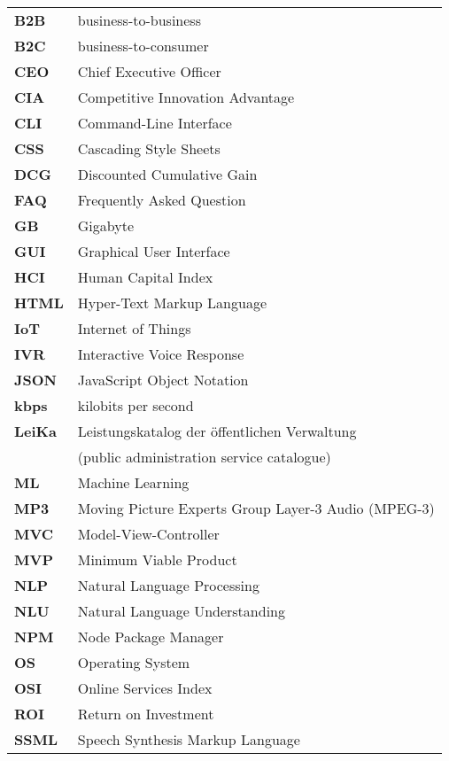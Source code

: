 \begin{flushleft}
\begin{tabular}{ll}
\textbf{B2B}	&	business-to-business\\
\textbf{B2C}	&	business-to-consumer\\

\textbf{CEO}	&	Chief Executive Officer\\
\textbf{CIA}	&	Competitive Innovation Advantage\\
\textbf{CLI}	&	Command-Line Interface\\
\textbf{CSS}	&	Cascading Style Sheets\\

\textbf{DCG}	&	Discounted Cumulative Gain\\

\textbf{FAQ}	&	Frequently Asked Question\\

\textbf{GB}		&	Gigabyte\\
\textbf{GUI}	&	Graphical User Interface\\

\textbf{HCI}	&	Human Capital Index\\
\textbf{HTML}	&	Hyper-Text Markup Language\\

\textbf{IoT}	&	Internet of Things\\
\textbf{IVR}	&	Interactive Voice Response\\

\textbf{JSON}	&	JavaScript Object Notation\\

\textbf{kbps}	&	kilobits per second\\

\textbf{LeiKa}	&	Leistungskatalog der öffentlichen Verwaltung \\
& (public administration service catalogue)\\


\textbf{ML}		&	Machine Learning\\
\textbf{MP3}	&	Moving Picture Experts Group Layer-3 Audio (MPEG-3)\\
\textbf{MVC}	&	Model-View-Controller\\
\textbf{MVP}	&	Minimum Viable Product\\

\textbf{NLP}	&	Natural Language Processing\\
\textbf{NLU}	&	Natural Language Understanding\\
\textbf{NPM}	&	Node Package Manager\\

\textbf{OS}		&	Operating System\\
\textbf{OSI}	&	Online Services Index\\
\textbf{ROI}	&	Return on Investment\\
\textbf{SSML}	&	Speech Synthesis Markup Language\\


\end{tabular}
\end{flushleft}
